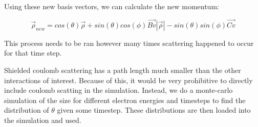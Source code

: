 \documentclass[]{article}
\begin{document}
Using these new basis vectors, we can calculate the new momentum:

\begin{equation}
\vec{\rho}_{new}= cos(\theta) \vec{\rho} + sin(\theta) cos(\phi) \vec{Bv} \left|\vec{\rho} \right| - sin(\theta) sin(\phi) \vec{Cv} 
\end{equation}

This process needs to be ran however many times scattering happened to occur for that time step. 

Shielded coulomb scattering has a path length much smaller than the other interactions of interest. Because of this, it would be very prohibitive to directly include coulomb scatting in the simulation. Instead, we do a monte-carlo simulation of the size for different electron energies and timesteps to find the distribution of $\theta$ given some timestep. These distributions are then loaded into the simulation and used. 
\end{document}
